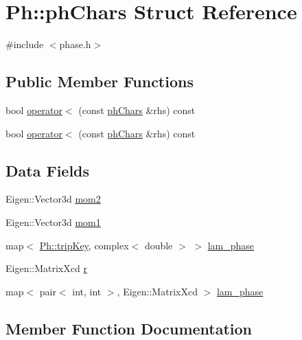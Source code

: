 \hypertarget{structPh_1_1phChars}{}\section{Ph\+:\+:ph\+Chars Struct Reference}
\label{structPh_1_1phChars}


{\ttfamily \#include $<$phase.\+h$>$}

\subsection*{Public Member Functions}
\begin{DoxyCompactItemize}
\item 
bool \mbox{\hyperlink{structPh_1_1phChars_af5b8755c7bff306b28edc0b5335e3541}{operator$<$}} (const \mbox{\hyperlink{structPh_1_1phChars}{ph\+Chars}} \&rhs) const
\item 
bool \mbox{\hyperlink{structPh_1_1phChars_af5b8755c7bff306b28edc0b5335e3541}{operator$<$}} (const \mbox{\hyperlink{structPh_1_1phChars}{ph\+Chars}} \&rhs) const
\end{DoxyCompactItemize}
\subsection*{Data Fields}
\begin{DoxyCompactItemize}
\item 
Eigen\+::\+Vector3d \mbox{\hyperlink{structPh_1_1phChars_a1458e97056bb5c7a5f99a2b81e33eddc}{mom2}}
\item 
Eigen\+::\+Vector3d \mbox{\hyperlink{structPh_1_1phChars_a3f4e550bbbc61af48cbe3c39bbea4147}{mom1}}
\item 
map$<$ \mbox{\hyperlink{namespacePh_afdd5bf3d7b37625115089ea3048e0cbb}{Ph\+::trip\+Key}}, complex$<$ double $>$ $>$ \mbox{\hyperlink{structPh_1_1phChars_af79d4feac7df252a92fc9faf0500d214}{lam\+\_\+phase}}
\item 
Eigen\+::\+Matrix\+Xcd \mbox{\hyperlink{structPh_1_1phChars_a953b0c01407ecc9b6ba27aa49a9f8587}{r}}
\item 
map$<$ pair$<$ int, int $>$, Eigen\+::\+Matrix\+Xcd $>$ \mbox{\hyperlink{structPh_1_1phChars_aa49234e892635da38021b0dfeb359c31}{lam\+\_\+phase}}
\end{DoxyCompactItemize}


\subsection{Member Function Documentation}
\mbox{\label{structPh_1_1phChars_af5b8755c7bff306b28edc0b5335e3541}} 
